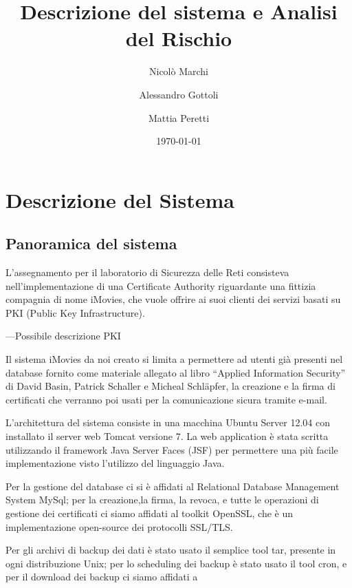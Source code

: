 \documentclass{article}
\title{\huge\sffamily\bfseries Descrizione del sistema e Analisi del Rischio}
\author{Nicolò Marchi \and Alessandro Gottoli \and Mattia Peretti}
\date{\today}
\begin{document}
\maketitle

\tableofcontents
\pagebreak


\section{Descrizione del Sistema}

\subsection{Panoramica del sistema}

L'assegnamento per il laboratorio di Sicurezza delle Reti consisteva nell'implementazione di una Certificate Authority riguardante una fittizia compagnia di nome iMovies, che vuole offrire ai suoi clienti dei servizi basati su PKI (Public Key Infrastructure).

---Possibile descrizione PKI

Il sistema iMovies da noi creato si limita a permettere ad utenti già presenti nel database fornito come materiale allegato al libro ``Applied Information Security'' di David Basin,  Patrick Schaller e Micheal Schl\"apfer, la creazione e la firma di certificati che verranno poi usati per la comunicazione sicura tramite e-mail.
\par L'architettura del sistema consiste in una macchina Ubuntu Server 12.04 con installato il server web Tomcat versione 7.
La web application è stata scritta utilizzando il framework Java Server Faces (JSF) per permettere una più facile implementazione visto l'utilizzo del linguaggio Java.
\par Per la gestione del database ci si è affidati al  Relational Database Management System MySql; per la creazione,la firma, la revoca, e tutte le operazioni di gestione dei certificati ci siamo affidati al toolkit OpenSSL, che è un implementazione open-source dei protocolli SSL/TLS. 
\par Per gli archivi di backup dei dati è stato usato il semplice tool tar, presente in ogni distribuzione Unix; per lo scheduling dei backup è stato usato il tool cron, e per il download dei backup ci siamo affidati a   

\end{document}
